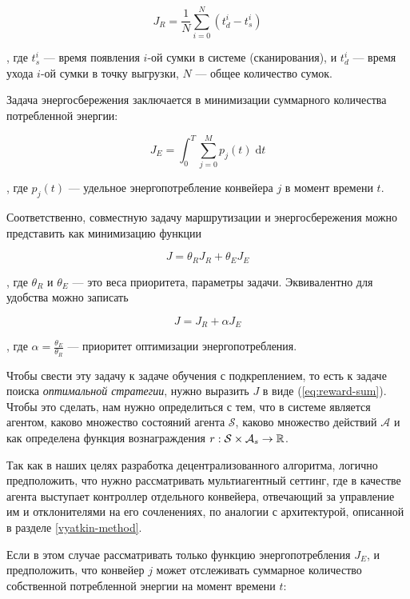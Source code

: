 \documentclass[specification,annotation,times]{itmo-student-thesis}
\theoremstyle{definition}
\begin{document}
\begin{equation}\label{eqs:J_r}
  J_R = \frac{1}{N} \sum\limits_{i=0}^{N} (t_d^i - t_s^i)
\end{equation}

, где $t_s^i$ --- время появления $i$-ой сумки в системе (сканирования), и
$t_d^i$ --- время ухода $i$-ой сумки в точку выгрузки, $N$ --- общее количество
сумок.

Задача энергосбережения заключается в минимизации суммарного количества
потребленной энергии:

\begin{equation}\label{eqs:J_e}
  J_E = \int_0^T \! \sum\limits_{j=0}^{M} p_j(t) \; \mathrm{d}t
\end{equation}

, где $p_j(t)$ --- удельное энергопотребление конвейера $j$ в момент времени $t$.

Соответственно, совместную задачу маршрутизации и энергосбережения можно
представить как минимизацию функции 

\begin{equation}
  J = \theta_R J_R + \theta_E J_E
\end{equation}

, где $\theta_R$ и $\theta_E$ --- это веса приоритета, параметры задачи.
Эквивалентно для удобства можно записать

\begin{equation}
  J = J_R + \alpha J_E
\end{equation}

, где $\alpha = \frac{\theta_E}{\theta_R}$ --- приоритет оптимизации
энергопотребления.

Чтобы свести эту задачу к задаче обучения с подкреплением, то есть к задаче
поиска \textit{оптимальной стратегии}, нужно выразить $J$ в виде
(\ref{eq:reward-sum}). Чтобы это сделать, нам нужно определиться с тем, что в
системе является агентом, каково множество состояний агента $\mathcal{S}$,
каково множество действий $\mathcal{A}$ и как определена функция вознаграждения
$r : \mathcal{S} \times \mathcal{A}_s \rightarrow \Bbb{R}$.

Так как в наших целях разработка децентрализованного алгоритма, логично
предположить, что нужно рассматривать мультиагентный сеттинг, где в качестве
агента выступает контроллер отдельного конвейера, отвечающий за управление им и
отклонителями на его сочленениях, по аналогии с архитектурой, описанной в
разделе \ref{vyatkin-method}.

Если в этом случае рассматривать только функцию
энергопотребления $J_E$, и предположить, что конвейер $j$ может отслеживать
суммарное количество собственной потребленной энергии на момент времени $t$:
\end{document}
